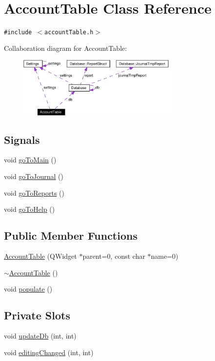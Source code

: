 \hypertarget{classAccountTable}{
\section{Account\-Table Class Reference}
\label{classAccountTable}
}
{\tt \#include $<$account\-Table.h$>$}

Collaboration diagram for Account\-Table:\begin{figure}[H]
\begin{center}
\leavevmode
\includegraphics[width=228pt]{classAccountTable__coll__graph}
\end{center}
\end{figure}
\subsection*{Signals}
\begin{CompactItemize}
\item 
void \hyperlink{classAccountTable_l0}{go\-To\-Main} ()
\item 
void \hyperlink{classAccountTable_l1}{go\-To\-Journal} ()
\item 
void \hyperlink{classAccountTable_l2}{go\-To\-Reports} ()
\item 
void \hyperlink{classAccountTable_l3}{go\-To\-Help} ()
\end{CompactItemize}
\subsection*{Public Member Functions}
\begin{CompactItemize}
\item 
\hyperlink{classAccountTable_a0}{Account\-Table} (QWidget $\ast$parent=0, const char $\ast$name=0)
\item 
\hyperlink{classAccountTable_a1}{$\sim$Account\-Table} ()
\item 
void \hyperlink{classAccountTable_a2}{populate} ()
\end{CompactItemize}
\subsection*{Private Slots}
\begin{CompactItemize}
\item 
void \hyperlink{classAccountTable_k0}{update\-Db} (int, int)
\item 
void \hyperlink{classAccountTable_k1}{editing\-Changed} (int, int)
\end{CompactItemize}
